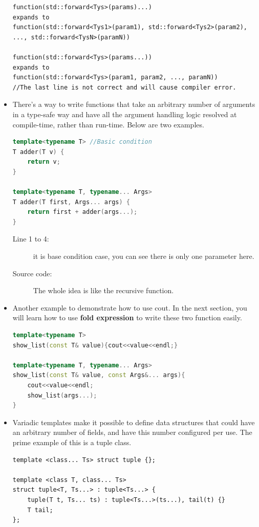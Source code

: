 \documentclass[a4paper,11pt,twoside]{book}
\begin{document}
\begin{itemize}
\begin{lstlisting}
function(std::forward<Tys>(params)...)
expands to
function(std::forward<Tys1>(param1), std::forward<Tys2>(param2), ..., std::forward<TysN>(paramN))

function(std::forward<Tys>(params...))
expands to
function(std::forward<Tys>(param1, param2, ..., paramN))
//The last line is not correct and will cause compiler error.
\end{lstlisting}

    \item There's a way to write functions that take an arbitrary number of arguments in a type-safe way and have all the argument handling logic resolved at compile-time, rather than run-time. Below are two examples.

\begin{lstlisting}[frame=single, language=c++]
template<typename T> //Basic condition
T adder(T v) {
	return v;
}

template<typename T, typename... Args>
T adder(T first, Args... args) {
	return first + adder(args...);
}
\end{lstlisting}
\begin{description}
	\item[Line 1 to 4:] it is base condition case, you can see there is only one parameter here.
	\item[Source code:] The whole idea is like the recursive function.
\end{description}

    \item Another example to demonstrate how to use cout. In the next section, you will learn how to use \textbf{fold expression} to write these two function easily.
\begin{lstlisting}[frame=single, language=c++]
template<typename T>
show_list(const T& value){cout<<value<<endl;}

template<typename T, typename... Args>
show_list(const T& value, const Args&... args){
	cout<<value<<endl;
	show_list(args...);
}
\end{lstlisting}

    \item Variadic templates make it possible to define data structures that could have an arbitrary number of fields, and have this number configured per use. The prime example of this is a tuple class.
\begin{lstlisting}
template <class... Ts> struct tuple {};

template <class T, class... Ts>
struct tuple<T, Ts...> : tuple<Ts...> {
	tuple(T t, Ts... ts) : tuple<Ts...>(ts...), tail(t) {}
	T tail;
};
\end{lstlisting}


\end{itemize}
\end{document}

